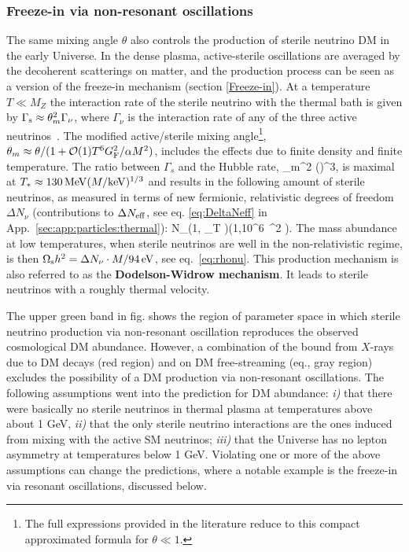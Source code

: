 \subsubsection{Freeze-in via non-resonant oscillations} 
The same mixing angle $\theta$ also controls the production of sterile neutrino DM in the early Universe. 
In the dense plasma, active-sterile oscillations are averaged by the decoherent scatterings on matter, and the production process can be seen as a version of the freeze-in mechanism (section \ref{Freeze-in}).
At a temperature $T\ll M_Z$ the interaction rate of the sterile neutrino with the thermal bath 
is given by $\Gamma_{\rm s} \approx \theta_m^2  \Gamma_\nu$, where $\Gamma_\nu$ is the interaction rate of any of the three active neutrinos~\cite{SterileNu}.
 The modified active/sterile mixing angle\footnote{The full expressions provided in the literature \cite{SterileNu} reduce to this compact approximated formula for $\theta \ll 1$.}, 
$\theta_m  \approx \theta/(1+{\mathcal O}(1)T^6 G_{\rm F}^2/\alpha M^2)$, includes the effects due to finite density and finite temperature. 
The ratio between $\Gamma_s$ and the Hubble rate,
\beq
  \approx  \theta_m^2 \left(\right)^3,
 \eeq
is maximal at  $T_* \approx  130\,{\rm MeV} (M/{\rm keV})^{1/3}$
and results in the following amount of sterile neutrinos, as measured in terms of new fermionic, relativistic degrees of freedom $\Delta N_\nu$ (contributions to $\Delta N_{\rm eff}$, see eq. \eqref{eq:DeltaNeff} in App.~\ref{sec:app:particles:thermal}):
\beq \label{eq:sterileOscAb}
\Delta N_\nu \approx \min\left (1, \max_T \right)\approx \min\left(1,10^6\, \theta^2 \right).
\eeq
The mass abundance at low temperatures, when sterile neutrinos are well in the non-relativistic regime,  is then $ \Omega_{\rm s} h^2 = \Delta N_\nu \cdot M/94\,{\rm eV} $, see eq.~\eqref{eq:rhonu}.
This production mechanism is also referred to as the {\bf Dodelson-Widrow mechanism}. It leads to sterile neutrinos with a roughly thermal velocity.



The upper green band in fig. shows the region of parameter space in which sterile neutrino production via non-resonant oscillation reproduces the observed cosmological DM abundance. However, a combination of the bound from $X$-rays due to DM decays
(red region) and on DM free-streaming (eq., gray region) excludes the possibility of a DM production via non-resonant oscillations. The following assumptions went into the prediction for DM abundance: {\em i)} that there were basically no sterile neutrinos in thermal plasma at temperatures above about 1 GeV, {\em ii)} that the only sterile neutrino interactions are the ones induced from mixing with the active SM neutrinos; 
{\em iii)} that the Universe has no lepton asymmetry at temperatures below 1 GeV. 
Violating one or more of the above assumptions can change the predictions, where a notable example is the freeze-in via resonant oscillations, discussed below. 



